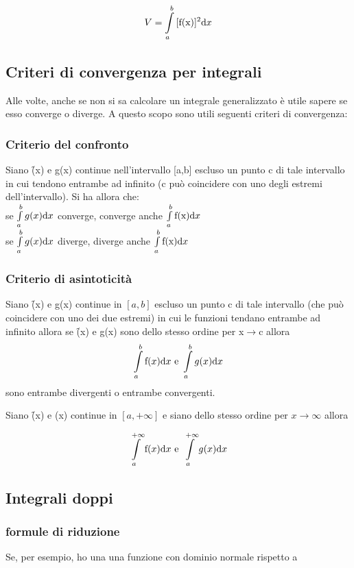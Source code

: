 \[
V=\int\limits_a^b{[\text{\text{f}(x)}]^2}{\rm d}x
\]

\subsection{Criteri di convergenza per integrali}
Alle volte, anche se non si sa calcolare un integrale generalizzato è utile sapere se esso converge o diverge. A questo scopo sono utili seguenti criteri di convergenza:\\

\subsubsection{Criterio del confronto}
Siano \f(x) e g(x) continue nell'intervallo [a,b] escluso un punto c di tale intervallo in cui tendono entrambe ad infinito (c può coincidere con uno degli estremi dell'intervallo). Si ha allora che:\\
se $\int\limits_a^b{g(x)}{\rm d}x$ converge, converge anche $\int\limits_a^b{\text{\text{f}(x)}}{\rm d}x$\\
se $\int\limits_a^b{g(x)}{\rm d}x$ diverge, diverge anche $\int\limits_a^b{\text{\text{f}(x)}}{\rm d}x$\\

\subsubsection{Criterio di asintoticità}
Siano \f(x) e g(x) continue in $[a,b]$ escluso un punto c di tale intervallo (che può coincidere con uno dei due estremi) in cui le funzioni tendano entrambe ad infinito allora se \f(x) e g(x) sono dello stesso ordine per x$\to$c allora
\[
\int\limits_a^b{\text{\text{f}}(x)}{\rm d}x \text{ e } \int\limits_a^b{g(x)}{\rm d}x
\]
sono entrambe divergenti o entrambe convergenti.

Siano \f(x) e \g(x) continue in $[a,+\infty]$ e siano dello stesso ordine per $x\to\infty$ allora

\[
\int\limits_a^{+\infty}{\text{\text{f}}(x)}{\rm d}x \text{ e } \int\limits_a^{+\infty}{g(x)}{\rm d}x
\]

\subsection{Integrali doppi}

\subsubsection{formule di riduzione}
Se, per esempio, ho una una funzione con dominio normale rispetto a

